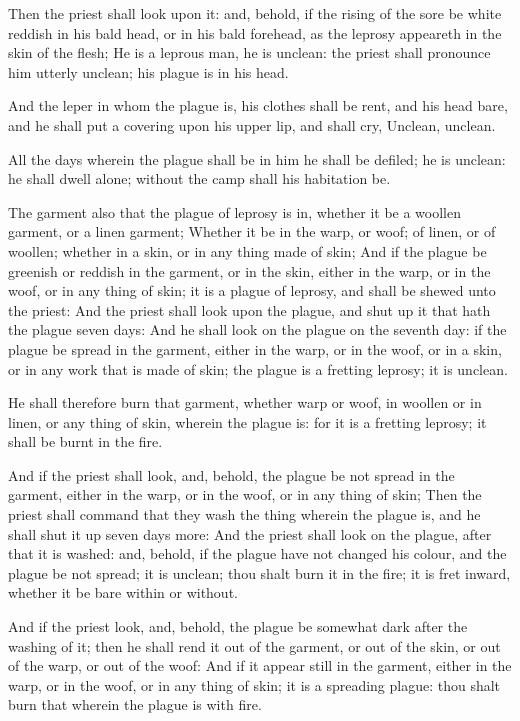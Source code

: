 \Verse Then the priest shall look upon it: and, behold, if the rising of the sore be white reddish in his bald head, or in his bald forehead, as the leprosy appeareth in the skin of the flesh; \Verse He is a leprous man, he is unclean: the priest shall pronounce him utterly unclean; his plague is in his head.

\Verse And the leper in whom the plague is, his clothes shall be rent, and his head bare, and he shall put a covering upon his upper lip, and shall cry, Unclean, unclean.

\Verse All the days wherein the plague shall be in him he shall be defiled; he is unclean: he shall dwell alone; without the camp shall his habitation be.

\Verse The garment also that the plague of leprosy is in, whether it be a woollen garment, or a linen garment; \Verse Whether it be in the warp, or woof; of linen, or of woollen; whether in a skin, or in any thing made of skin; \Verse And if the plague be greenish or reddish in the garment, or in the skin, either in the warp, or in the woof, or in any thing of skin; it is a plague of leprosy, and shall be shewed unto the priest: \Verse And the priest shall look upon the plague, and shut up it that hath the plague seven days: \Verse And he shall look on the plague on the seventh day: if the plague be spread in the garment, either in the warp, or in the woof, or in a skin, or in any work that is made of skin; the plague is a fretting leprosy; it is unclean.

\Verse He shall therefore burn that garment, whether warp or woof, in woollen or in linen, or any thing of skin, wherein the plague is: for it is a fretting leprosy; it shall be burnt in the fire.

\Verse And if the priest shall look, and, behold, the plague be not spread in the garment, either in the warp, or in the woof, or in any thing of skin; \Verse Then the priest shall command that they wash the thing wherein the plague is, and he shall shut it up seven days more: \Verse And the priest shall look on the plague, after that it is washed: and, behold, if the plague have not changed his colour, and the plague be not spread; it is unclean; thou shalt burn it in the fire; it is fret inward, whether it be bare within or without.

\Verse And if the priest look, and, behold, the plague be somewhat dark after the washing of it; then he shall rend it out of the garment, or out of the skin, or out of the warp, or out of the woof: \Verse And if it appear still in the garment, either in the warp, or in the woof, or in any thing of skin; it is a spreading plague: thou shalt burn that wherein the plague is with fire.

